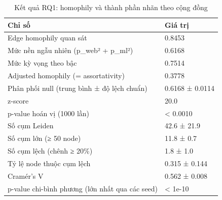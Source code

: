 \begin{table}[htbp]
\caption{Kết quả RQ1: homophily và thành phần nhãn theo cộng đồng}
\label{tab:rq1_summary}
\begin{tabular}{ll}
\toprule
Chỉ số & Giá trị \\
\midrule
Edge homophily quan sát & 0.8453 \\
Mức nền ngẫu nhiên (p\_web² + p\_ml²) & 0.6168 \\
Mức kỳ vọng theo bậc & 0.7514 \\
Adjusted homophily (= assortativity) & 0.3778 \\
Phân phối null (trung bình ± độ lệch chuẩn) & 0.6168 ± 0.0114 \\
z-score & 20.0 \\
p-value hoán vị (1000 lần) & < 0.0010 \\
Số cụm Leiden & 42.6 ± 21.9 \\
Số cụm lớn (≥ 50 node) & 11.8 ± 0.7 \\
Số cụm lệch (chênh ≥ 20\%) & 1.8 ± 1.0 \\
Tỷ lệ node thuộc cụm lệch & 0.315 ± 0.144 \\
Cramér's V & 0.562 ± 0.008 \\
p-value chi-bình phương (lớn nhất qua các seed) & < 1e-10 \\
\bottomrule
\end{tabular}
\end{table}
